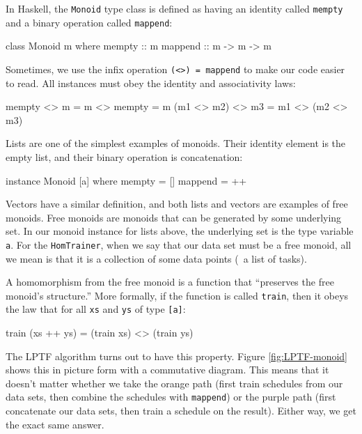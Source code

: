 \documentclass[tikz]{tmr}
\newcommand\h{\lstinline}
\newcommand\+{\mdoubleplus}
\begin{document}
In Haskell, the \h{Monoid} type class is defined as having an identity called \h{mempty} and a binary operation called \h{mappend}:
\begin{spec}
class Monoid m where
    mempty  :: m
    mappend :: m -> m -> m
\end{spec}
Sometimes, we use the infix operation \h{(<>) = mappend} to make our code easier to read.
All instances must obey the identity and associativity laws:
\begin{spec}
mempty <> m = m <> mempty = m
(m1 <> m2) <> m3 = m1 <> (m2 <> m3)
\end{spec}
Lists are one of the simplest examples of monoids.
Their identity element is the empty list, and their binary operation is concatenation:
\begin{spec}
instance Monoid [a] where
    mempty = []
    mappend = ++
\end{spec}
Vectors have a similar definition, and both lists and vectors are examples of free monoids.
Free monoids are monoids that can be generated by some underlying set.
In our monoid instance for lists above, the underlying set is the type variable \h{a}.
For the \h{HomTrainer}, when we say that our data set must be a free monoid, all we mean is that it is a collection of some data points
(\eg\ a list of tasks).

A homomorphism from the free monoid is a function that ``preserves the free monoid's structure.'' 
More formally, if the function is called \h{train}, then it obeys the law that for all \lstinline{xs} and \lstinline{ys} of type \lstinline{[a]}:
\begin{spec}
train (xs ++ ys) = (train xs) <> (train ys)
\end{spec}
The LPTF algorithm turns out to have this property.
Figure \ref{fig:LPTF-monoid} shows this in picture form with a commutative diagram.
This means that it doesn't matter whether we take the orange path (first train schedules from our data sets, then combine the schedules with \h{mappend}) or the purple path (first concatenate our data sets, then train a schedule on the result).
Either way, we get the exact same answer.
\end{document}
